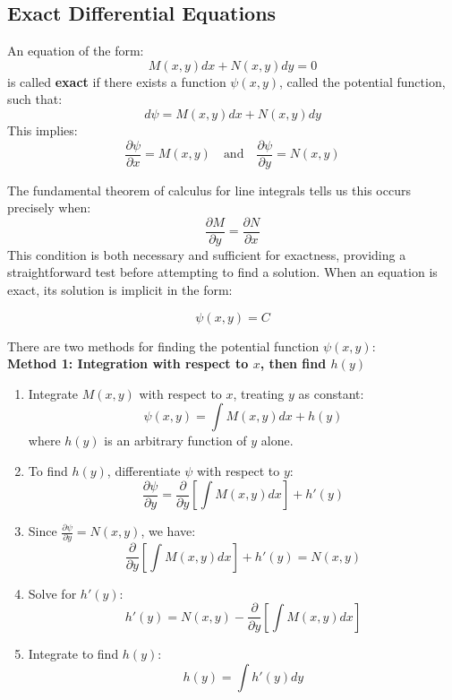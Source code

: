 \subsection*{Exact Differential Equations} 

\noindent An equation of the form:
\[
M(x,y)dx + N(x,y)dy = 0
\]
is called \textbf{exact} if there exists a function $\psi(x,y)$, called the potential function, such that:
\[
d\psi = M(x,y)dx + N(x,y)dy
\]
This implies:
\[
\frac{\partial \psi}{\partial x} = M(x,y) \quad \text{and} \quad \frac{\partial \psi}{\partial y} = N(x,y)
\]

\noindent The fundamental theorem of calculus for line integrals tells us this occurs precisely when:
\[
\frac{\partial M}{\partial y} = \frac{\partial N}{\partial x}
\]
This condition is both necessary and sufficient for exactness, providing a straightforward test before attempting to find a solution. When an equation is exact, its solution is implicit in the form:

\[
\psi(x,y) = C
\]

\noindent There are two methods for finding the potential function $\psi(x,y)$: \\

\noindent \textbf{Method 1: Integration with respect to $x$, then find $h(y)$} \\
\begin{enumerate}
    \item Integrate $M(x,y)$ with respect to $x$, treating $y$ as constant:
    \[
    \psi(x,y) = \int M(x,y)dx + h(y)
    \]
    where $h(y)$ is an arbitrary function of $y$ alone.
    
    \item To find $h(y)$, differentiate $\psi$ with respect to $y$:
    \[
    \frac{\partial \psi}{\partial y} = \frac{\partial}{\partial y}\left[\int M(x,y)dx\right] + h'(y)
    \]
    
    \item Since $\frac{\partial \psi}{\partial y} = N(x,y)$, we have:
    \[
    \frac{\partial}{\partial y}\left[\int M(x,y)dx\right] + h'(y) = N(x,y)
    \]
    
    \item Solve for $h'(y)$:
    \[
    h'(y) = N(x,y) - \frac{\partial}{\partial y}\left[\int M(x,y)dx\right]
    \]
    
    \item Integrate to find $h(y)$:
    \[
    h(y) = \int h'(y)dy
    \]
\end{enumerate}


